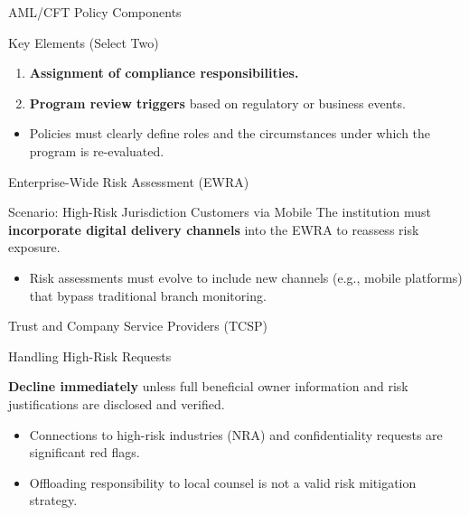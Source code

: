 \documentclass{beamer}
\begin{document}
	\begin{frame}{AML/CFT Policy Components}
		\begin{block}{Key Elements (Select Two)}
			\begin{enumerate}
				\item \textbf{Assignment of compliance responsibilities.}
				\item \textbf{Program review triggers} based on regulatory or business events.
			\end{enumerate}
		\end{block}
		\begin{itemize}
			\item Policies must clearly define roles and the circumstances under which the program is re-evaluated.
		\end{itemize}
	\end{frame}
	
	\begin{frame}{Enterprise-Wide Risk Assessment (EWRA)}
		\begin{block}{Scenario: High-Risk Jurisdiction Customers via Mobile}
			The institution must \textbf{incorporate digital delivery channels} into the EWRA to reassess risk exposure.
		\end{block}
		\begin{itemize}
			\item Risk assessments must evolve to include new channels (e.g., mobile platforms) that bypass traditional branch monitoring.
		\end{itemize}
	\end{frame}
	
	\begin{frame}{Trust and Company Service Providers (TCSP)}
		\begin{block}{Handling High-Risk Requests}
			\begin{center}
				\textbf{Decline immediately} unless full beneficial owner information and risk justifications are disclosed and verified.
			\end{center}
		\end{block}
		\begin{itemize}
			\item Connections to high-risk industries (NRA) and confidentiality requests are significant red flags.
			\item Offloading responsibility to local counsel is not a valid risk mitigation strategy.
		\end{itemize}
	\end{frame}
	
\end{document}
